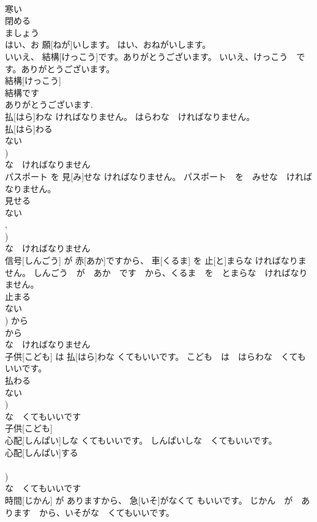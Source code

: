 \documentclass[8pt]{extreport}
\begin{document}
\begin{CJK}{UTF8}{min}
\\	寒い 
\\	閉める 
\\	ましょう 
\\	はい、お 願[ねが]いします。	はい、おねがいします。	
\\	いいえ、 結構[けっこう]です。ありがとうございます。	いいえ、けっこう　です。ありがとうございます。	
\\	結構[けっこう] 
\\	結構です 
\\	ありがとうございます.				
\\	払[はら]わな ければなりません。	はらわな　ければなりません。	
\\	払[はら]わる 
\\	ない 
\\	[な])	
\\	な　ければなりません 
\\	パスポート を 見[み]せな ければなりません。	パスポート　を　みせな　ければなりません。	
\\	見せる 
\\	ない 
\\	[る], 
\\	[な])	
\\	な　ければなりません 
\\	信号[しんごう] が 赤[あか]ですから、 車[くるま] を 止[と]まらな ければなりません。	しんごう　が　あか　です　から、くるま　を　とまらな　ければなりません。	
\\	止まる 
\\	ない 
\\	[な])	から 
\\	から 
\\	な　ければなりません 
\\	子供[こども] は 払[はら]わな くてもいいです。	こども　は　はらわな　くてもいいです。	
\\	払わる 
\\	ない 
\\	[な])	
\\	な　くてもいいです 
\\	子供[こども] 
\\	心配[しんぱい]しな くてもいいです。	しんぱいしな　くてもいいです。	
\\	心配[しんぱい]する 
\\	[する] 
\\	[しない])	
\\	な　くてもいいです 
\\	時間[じかん] が ありますから、 急[いそ]がなくて もいいです。	じかん　が　あります　から、いそがな　くてもいいです。	

\end{CJK}
\end{document}
